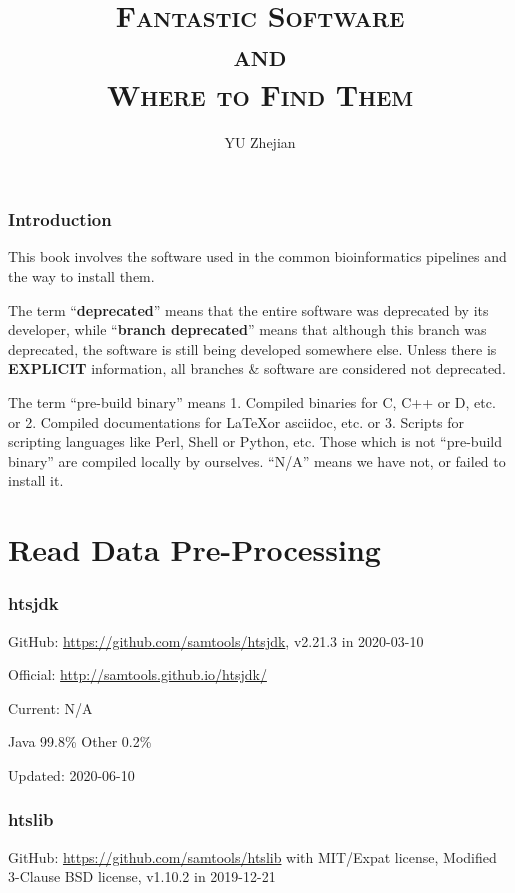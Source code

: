 \documentclass[]{article}
\begin{document}
\title{\fontsize{40}{40}\selectfont\scshape Fantastic Software\\{\Huge and}\\Where to Find Them}
\author{YU Zhejian}
\maketitle
\setcounter{section}{-1}
\section{Introduction}

This book involves the software used in the common bioinformatics pipelines and the way to install them.

The term ``\textbf{deprecated}'' means that the entire software was deprecated by its developer, while ``\textbf{branch deprecated}'' means that although this branch was deprecated, the software is still being developed somewhere else. Unless there is \textbf{EXPLICIT} information, all branches \& software are considered not deprecated.

The term ``pre-build binary'' means 1. Compiled binaries for C, C++ or D, etc. or 2. Compiled documentations for \LaTeX or asciidoc, etc. or 3. Scripts for scripting languages like Perl, Shell or Python, etc. Those which is not ``pre-build binary'' are compiled locally by ourselves. ``N/A'' means we have not, or failed to install it.

\tableofcontents

\part{Read Data Pre-Processing}

\section{htsjdk}

GitHub: \url{https://github.com/samtools/htsjdk}, v2.21.3 in 2020-03-10

Official: \url{http://samtools.github.io/htsjdk/}

Current: N/A

Java 99.8\% Other 0.2\% 

Updated: 2020-06-10
\section{htslib}

GitHub: \url{https://github.com/samtools/htslib} with MIT/Expat license, Modified 3-Clause BSD license, v1.10.2 in 2019-12-21 
\end{document}
